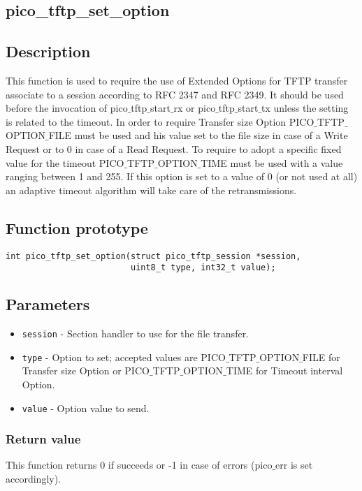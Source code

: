 \subsection{pico\_tftp\_set\_option}

\subsection*{Description}
This function is used to require the use of Extended Options for TFTP transfer associate to a session according to RFC 2347 and RFC 2349. It should be used before the invocation of pico$\_$tftp$\_$start$\_$rx or pico$\_$tftp$\_$start$\_$tx unless the setting is related to the timeout.
In order to require Transfer size Option PICO$\_$TFTP$\_$OPTION$\_$FILE must be used and his value set to the file size in case of a Write Request or to 0 in case of a Read Request.
To require to adopt a specific fixed value for the timeout PICO$\_$TFTP$\_$OPTION$\_$TIME must be used with a value ranging between 1 and 255. If this option is set to a value of 0 (or not used at all) an adaptive timeout algorithm will take care of the retransmissions.

\subsection*{Function prototype}
\begin{verbatim}
int pico_tftp_set_option(struct pico_tftp_session *session,
                         uint8_t type, int32_t value);
\end{verbatim}

\subsection*{Parameters}
\begin{itemize}[noitemsep]
\item \texttt{session} - Section handler to use for the file transfer.
\item \texttt{type} - Option to set; accepted values are PICO$\_$TFTP$\_$OPTION$\_$FILE for Transfer size Option or PICO$\_$TFTP$\_$OPTION$\_$TIME for Timeout interval Option.
\item \texttt{value} - Option value to send.
\end{itemize}

\subsubsection*{Return value}
This function returns 0 if succeeds or -1 in case of errors (pico$\_$err is set accordingly).

